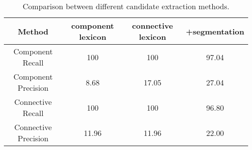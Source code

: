\begin{table}[!htbp]
\centering
\begin{tabular}{|c|c|c|c|}
\hline
Method                  & component lexicon & connective lexicon & +segmentation \\ \hline

Component Recall        & 100               & 100                & 97.04         \\ \hline
Component Precision     & 8.68              & 17.05              & 27.04         \\

\hhline{|=|=|=|=|}

Connective Recall       & 100               & 100                & 96.80         \\ \hline
Connective Precision    & 11.96             & 11.96              & 22.00         \\ \hline

\end{tabular}
\caption{\label{t:cand-extract} Comparison between different candidate extraction methods.}
\end{table}
